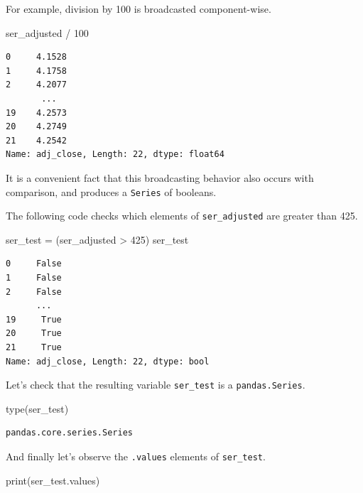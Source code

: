 \documentclass[
  letterpaper,
  DIV=11,
  numbers=noendperiod]{scrreprt}
\newenvironment{Shaded}{\begin{snugshade}}{\end{snugshade}}
\newcommand{\BuiltInTok}[1]{\textcolor[rgb]{0.00,0.23,0.31}{#1}}
\newcommand{\DecValTok}[1]{\textcolor[rgb]{0.68,0.00,0.00}{#1}}
\newcommand{\NormalTok}[1]{\textcolor[rgb]{0.00,0.23,0.31}{#1}}
\newcommand{\OperatorTok}[1]{\textcolor[rgb]{0.37,0.37,0.37}{#1}}
\begin{document}
For example, division by 100 is broadcasted component-wise.

\begin{Shaded}
\begin{Highlighting}[]
\NormalTok{ser\_adjusted }\OperatorTok{/} \DecValTok{100}
\end{Highlighting}
\end{Shaded}

\begin{verbatim}
0     4.1528
1     4.1758
2     4.2077
       ...  
19    4.2573
20    4.2749
21    4.2542
Name: adj_close, Length: 22, dtype: float64
\end{verbatim}

It is a convenient fact that this broadcasting behavior also occurs with
comparison, and produces a \texttt{Series} of booleans.

The following code checks which elements of \texttt{ser\_adjusted} are
greater than 425.

\begin{Shaded}
\begin{Highlighting}[]
\NormalTok{ser\_test }\OperatorTok{=}\NormalTok{ (ser\_adjusted }\OperatorTok{\textgreater{}} \DecValTok{425}\NormalTok{)}
\NormalTok{ser\_test}
\end{Highlighting}
\end{Shaded}

\begin{verbatim}
0     False
1     False
2     False
      ...  
19     True
20     True
21     True
Name: adj_close, Length: 22, dtype: bool
\end{verbatim}

Let's check that the resulting variable \texttt{ser\_test} is a
\texttt{pandas.Series}.

\begin{Shaded}
\begin{Highlighting}[]
\BuiltInTok{type}\NormalTok{(ser\_test)}
\end{Highlighting}
\end{Shaded}

\begin{verbatim}
pandas.core.series.Series
\end{verbatim}

And finally let's observe the \texttt{.values} elements of
\texttt{ser\_test}.

\begin{Shaded}
\begin{Highlighting}[]
\BuiltInTok{print}\NormalTok{(ser\_test.values)}
\end{Highlighting}
\end{Shaded}
\end{document}
